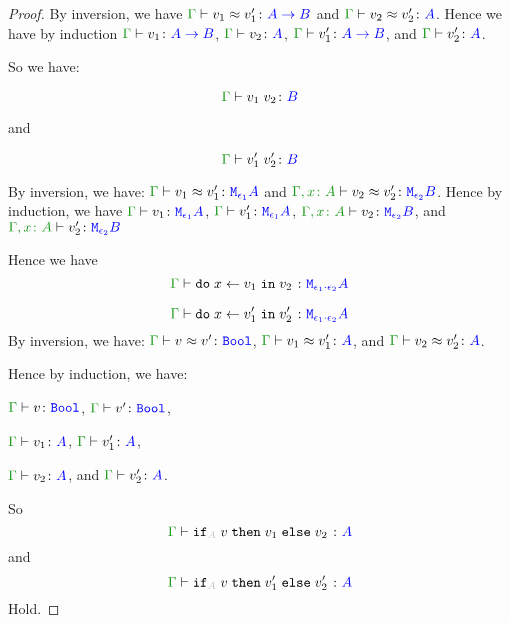 \documentclass{report}
\begin{document}
\begin{framed}
\begin{proof}
            By inversion, we have $\gberelation{v_1}{v_1'}{\ab}$ and $\gberelation{v_2}{v_2'}{A}$. Hence we have by induction $\gtyperelation{v_1}{\ab}$, $\gtyperelation{v_2}{A}$, $\gtyperelation{v_1'}{\ab}$, and $\gtyperelation{v_2'}{A}$.
        
            So we have:
        
            \begin{equation}
                \gtyperelation{\apply{v_1}{v_2}}{B}
            \end{equation}
        
            and
        
            
            \begin{equation}
                \gtyperelation{\apply{v_1'}{v_2'}}{B}
            \end{equation}
        
            By inversion, we have:
            $\gberelation{v_1}{v_1'}{\M{\e_1}{A}}$ and
            $\berelation{\gax}{v_2}{v_2'}{\M{\e_2}{B}}$.
            Hence by induction, we have 
            $\gtyperelation{v_1}{\M{\e_1}{A}}$,
            $\gtyperelation{v_1'}{\M{\e_1}{A}}$,
            $\typerelation{\gax}{v_2}{\M{\e_2}{B}}$, and 
            $\typerelation{\gax}{v_2'}{\M{\e_2}{B}}$
        
            Hence we have 
            \begin{equation}
                \gtyperelation{\doin{x}{v_1}{v_2}}{\M{\e_1\dot\e_2}{A}}
            \end{equation}
        
            
            \begin{equation}
                \gtyperelation{\doin{x}{v_1'}{v_2'}}{\M{\e_1\dot\e_2}{A}}
            \end{equation}
        By inversion, we have:
        $\gberelation{v}{v'}{\B}$,
        $\gberelation{v_1}{v_1'}{ A}$, and
        $\gberelation{v_2}{v_2'}{ A}$.
        
        Hence by induction, we have:
        
        $\gtyperelation{v}{\B}$,
        $\gtyperelation{v'}{\B}$,
        
        $\gtyperelation{v_1}{ A}$,
        $\gtyperelation{v_1'}{ A}$,
        
        
        $\gtyperelation{v_2}{ A}$, and
        $\gtyperelation{v_2'}{ A}$.
        
        So 
        \begin{equation}
            \gtyperelation{\pifthenelse{A}{v}{v_1}{v_2}}{ A}
        \end{equation}
        and
        \begin{equation}
            \gtyperelation{\pifthenelse{A}{v}{v_1'}{v_2'}}{ A}
        \end{equation}
        Hold.
        

\end{proof}
\end{framed}
\end{document}
